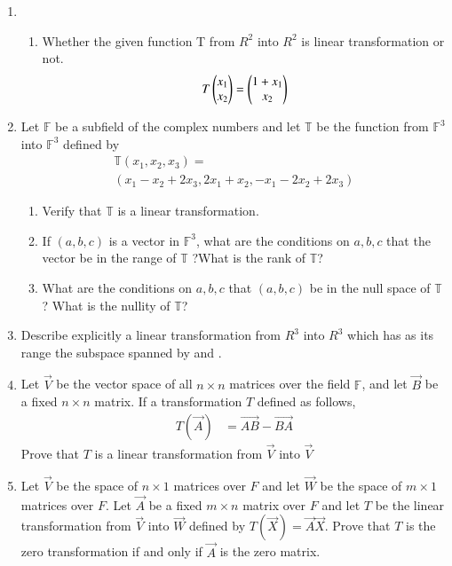 \renewcommand{\theequation}{\theenumi}
\renewcommand{\thefigure}{\theenumi}
\begin{enumerate}[label=\thesubsection.\arabic*.,ref=\thesubsection.\theenumi]
%
\item 
\begin{enumerate}
\item Whether the given function T from $R^2$ into $R^2$ is linear transformation or not.
\begin{align}
    T\begin{pmatrix}x_1\\x_2\end{pmatrix}=\begin{pmatrix}1+x_1\\x_2\end{pmatrix}
\label{eq:solutions/3/1/1/a/1}
\end{align}
\solution


\end{enumerate}
\item Let $\mathbb{F}$ be a subfield of the complex numbers and let $\mathbb{T}$ be the function from $\mathbb{F}^3$ into $\mathbb{F}^3$ defined by 
\begin{align}
    \mathbb{T}(x_1,x_2,x_3)=\\(x_1-x_2+2x_3,2x_1+x_2,-x_1-2x_2+2x_3)
\end{align}
\begin{enumerate}
\item  Verify that $\mathbb{T}$ is a linear transformation.\\
\item  If $(a,b,c)$ is a vector in  $\mathbb{F}^3$, what are the conditions on $a,b,c$ that the vector be in the range of  $\mathbb{T}$ ?What is the rank of  $\mathbb{T}$?\\
\item  What are the conditions on $a,b,c$ that $(a,b,c)$ be in the null space of  
$\mathbb{T}$? What is the nullity of  $\mathbb{T}$?
\end{enumerate}
\solution

\item Describe explicitly a linear transformation from $R^{3}$ into $R^{3}$ which has as its range the subspace spanned by  and .  
%
\\
\solution

\item Let $\vec{V}$ be the vector space of all $n \times n$ matrices over the field $\mathbb{F}$, and let $\vec{B}$ be a fixed $n \times n$ matrix. If a transformation $T$ defined as follows,
\begin{align*}
    T(\vec{A}) &= \vec{AB} - \vec{BA}
\end{align*}
Prove that $T$ is a linear transformation from $\vec{V}$ into $\vec{V}$
%
\solution

%
\item Let $\vec{V}$ be the space of $n \times 1$ matrices over $F$ and let $\vec{W}$ be the space of $m \times 1$ matrices over $F$. Let $\vec{A}$ be a fixed $m \times n$ matrix over $F$ and let $T$ be the linear transformation from $\vec{V}$ into $\vec{W}$ defined by $T(\vec{X}) = \vec{A}\vec{X}$. Prove that $T$ is the zero transformation if and only if $\vec{A}$ is the zero matrix.
%
\solution

\end{enumerate}
